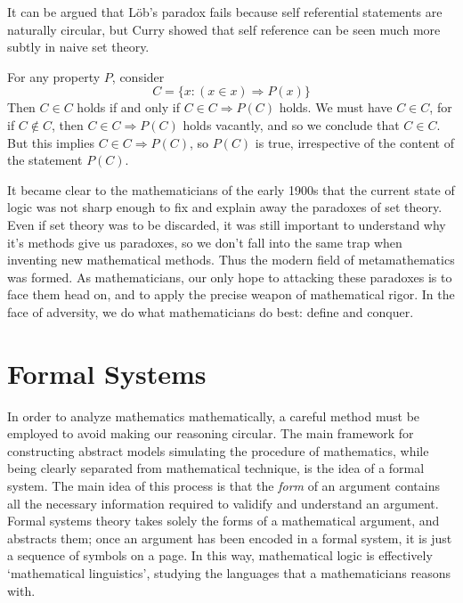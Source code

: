 It can be argued that L\"{o}b's paradox fails because self referential statements are naturally circular, but Curry showed that self reference can be seen much more subtly in naive set theory.

\begin{example}[Curry]
    For any property $P$, consider
    \[ C = \{ x : (x \in x) \Rightarrow P(x) \} \]
    Then $C \in C$ holds if and only if $C \in C \Rightarrow P(C)$ holds. We must have $C \in C$, for if $C \not \in C$, then $C \in C \Rightarrow P(C)$ holds vacantly, and so we conclude that $C \in C$. But this implies $C \in C \Rightarrow P(C)$, so $P(C)$ is true, irrespective of the content of the statement $P(C)$.
\end{example}

It became clear to the mathematicians of the early 1900s that the current state of logic was not sharp enough to fix and explain away the paradoxes of set theory. Even if set theory was to be discarded, it was still important to understand why it's methods give us paradoxes, so we don't fall into the same trap when inventing new mathematical methods. Thus the modern field of metamathematics was formed. As mathematicians, our only hope to attacking these paradoxes is to face them head on, and to apply the precise weapon of mathematical rigor. In the face of adversity, we do what mathematicians do best: define and conquer.

\section{Formal Systems}

In order to analyze mathematics mathematically, a careful method must be employed to avoid making our reasoning circular. The main framework for constructing abstract models simulating the procedure of mathematics, while being clearly separated from mathematical technique, is the idea of a formal system. The main idea of this process is that the {\it form} of an argument contains all the necessary information required to validify and understand an argument. Formal systems theory takes solely the forms of a mathematical argument, and abstracts them; once an argument has been encoded in a formal system, it is just a sequence of symbols on a page. In this way, mathematical logic is effectively `mathematical linguistics', studying the languages that a mathematicians reasons with.

